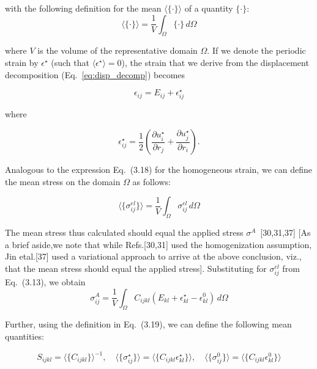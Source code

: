 with the following definition for the mean $\langle\{\cdot\}\rangle$ of a quantity $\{\cdot\}$:
\begin{equation}
\langle\{\cdot\}\rangle=\frac{1}{V}\int_\Omega \{\cdot\}\,d\Omega
\end{equation}

where $V$ is the volume of the representative domain $\Omega$. If we denote the periodic strain by $\epsilon^\star$ (such that $\langle \epsilon^\star\rangle=0$), the strain that we derive from the displacement decomposition (Eq.~\eqref{eq:disp_decomp}) becomes

\begin{equation}
\epsilon_{ij}=E_{ij}+\epsilon^{\star}_{ij}
\end{equation}

where

\begin{equation}
\epsilon^{\star}_{ij}=\frac{1}{2}\left(\frac{\partial u^{\star}_i}{\partial r_j}+\frac{\partial u^{\star}_j}{\partial r_i}\right).
\end{equation}

Analogous to the expression Eq.~(3.18) for the homogeneous strain, we can define the mean stress on the domain $\Omega$ as follows:

\begin{equation}
\langle\{\sigma^{el}_{ij}\}\rangle=\frac{1}{V}\int_\Omega \sigma^{el}_{ij}\,d\Omega
\end{equation}

The mean stress thus calculated should equal the applied stress $\sigma^A$~[30,31,37] [As a brief aside,we note that while Refs.[30,31] used the homogenization assumption, Jin etal.[37] used a variational approach to arrive at the above conclusion, viz., that the mean stress should equal the applied stress]. Substituting for $\sigma^{el}_{ij}$ from Eq.~(3.13), we obtain
\begin{equation}
\sigma^A_{ij}=\frac{1}{V}\int_\Omega C_{ijkl}\left(E_{kl}+\epsilon^{\star}_{kl}-\epsilon^0_{kl}\right)\,d\Omega
\end{equation}

Further, using the definition in Eq.~(3.19), we can define the following mean quantities:

\begin{equation}
S_{ijkl}=\langle \{C_{ijkl}\}\rangle^{-1},\quad
\langle\{\sigma^{\star}_{ij}\}\rangle=\langle \{C_{ijkl}\epsilon^{\star}_{kl}\}\rangle,\quad
\langle\{\sigma^0_{ij}\}\rangle=\langle \{C_{ijkl}\epsilon^0_{kl}\}\rangle
\end{equation}

